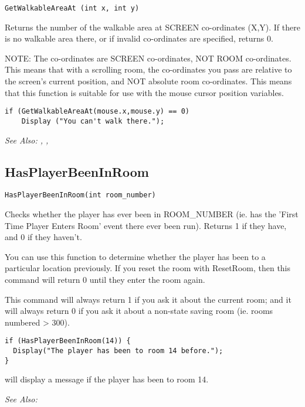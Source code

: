 \begin{verbatim}
GetWalkableAreaAt (int x, int y)
\end{verbatim}
Returns the number of the walkable area at SCREEN co-ordinates (X,Y).
If there is no walkable area there, or if invalid co-ordinates are specified,
returns 0.

NOTE: The co-ordinates are SCREEN co-ordinates, NOT ROOM co-ordinates. This
means that with a scrolling room, the co-ordinates you pass are relative to
the screen's current position, and NOT absolute room co-ordinates. This
means that this function is suitable for use with the mouse cursor position
variables.

\begin{verbatim}
if (GetWalkableAreaAt(mouse.x,mouse.y) == 0)
    Display ("You can't walk there.");
\end{verbatim}

\it{See Also:} ,
,


\subsection{HasPlayerBeenInRoom}\label{HasPlayerBeenInRoom}%

\begin{verbatim}
HasPlayerBeenInRoom(int room_number)
\end{verbatim}
Checks whether the player has ever been in ROOM_NUMBER (ie. has the 'First Time Player
Enters Room' event there ever been run). Returns 1 if they have, and 0 if they haven't.

You can use this function to determine whether the player has been to a particular location
previously. If you reset the room with ResetRoom, then this command will return 0 until
they enter the room again.

This command will always return 1 if you ask it about the current room; and it will always
return 0 if you ask it about a non-state saving room (ie. rooms numbered > 300).

\begin{verbatim}
if (HasPlayerBeenInRoom(14)) {
  Display("The player has been to room 14 before.");
}
\end{verbatim}
will display a message if the player has been to room 14.

\it{See Also:} 


